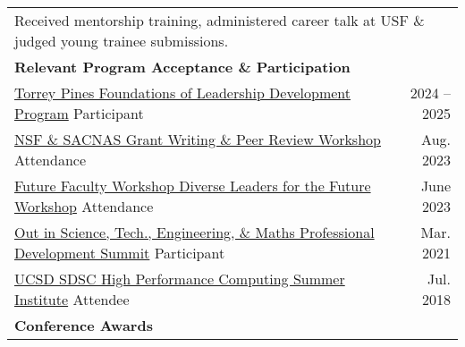 \documentclass[letterpaper,11pt]{article}
\begin{document}
\begin{longtable}{@{}p{}r@{}}
    \multicolumn{2}{l}{\hspace{4mm} Received mentorship training, administered career talk at USF \& judged young trainee submissions.}                                                                                                                            \\ [10pt]
  \multicolumn{2}{l}{\hspace{-3mm} \bf{Relevant Program Acceptance \& Participation}} 	                                                                                                                                                                           \\ [5pt]
  \hspace{3mm} \href{http://sbpleaders.org/SitePages/Foundations.aspx}{Torrey Pines Foundations of Leadership Development Program} Participant                                                                                                      & 2024 -- 2025 \\ [4pt]
  \hspace{3mm} \href{https://www.sacnas.org/professional-programs#:~:text=NSF\%20\%26\%20SACNAS\%20GRANT\%20WRITING\%20AND\%20PEER\%20REVIEW\%20WORKSHOP}{NSF \& SACNAS Grant Writing \& Peer Review Workshop} Attendance                           & Aug. 2023    \\ [4pt]
  \hspace{3mm} \href{https://sites.udel.edu/future-faculty-workshop/}{Future Faculty Workshop Diverse Leaders for the Future Workshop} Attendance                                                                                                   & June 2023    \\ [4pt]
  \hspace{3mm} \href{https://ostem.org/page/professional-development-summit}{Out in Science, Tech., Engineering, \& Maths Professional Development Summit} Participant                                                                                 & Mar. 2021    \\ [4pt]
  \hspace{3mm} \href{https://www.sdsc.edu/education_and_training/summer_institute.html}{UCSD SDSC High Performance Computing Summer Institute} Attendee                                                                                             & Jul. 2018    \\ [10pt]
  \multicolumn{2}{l}{\hspace{-3mm} \bf{Conference Awards}} 	                                                                                                                                                                                                   \\ [5pt]

\end{longtable}
\end{document}
